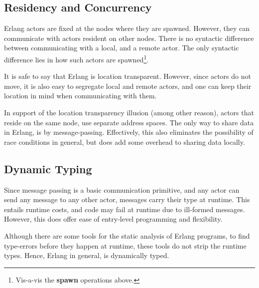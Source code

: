 \subsection*{Residency and Concurrency}

Erlang actors are fixed at the nodes where they are spawned. However,
they can communicate with actors resident on other nodes. There is no
syntactic difference between communicating with a local, and a remote
actor. The only syntactic difference lies in how such actors are
spawned\footnote{Vis-a-vis the \textbf{spawn} operations above.}.

It is safe to say that Erlang is location transparent. However, since
actors do not move, it is also easy to segregate local and remote
actors, and one can keep their location in mind when communicating
with them.

In support of the location transparency illusion (among other reason),
actors that reside on the same node, use separate address spaces. The
only way to share data in Erlang, is by message-passing. Effectively,
this also eliminates the possibility of race conditions in general,
but does add some overhead to sharing data locally.

\subsection*{Dynamic Typing}

Since message passing is a basic communication primitive, and any
actor can send any message to any other actor, messages carry their
type at runtime. This entails runtime costs, and code may fail at
runtime due to ill-formed messages. However, this does offer ease of
entry-level programming and flexibility.

Although there are some tools for the static analysis of Erlang
programs, to find type-errors before they happen at runtime, these
tools do not strip the runtime types. Hence, Erlang in general, is
dynamically typed.
